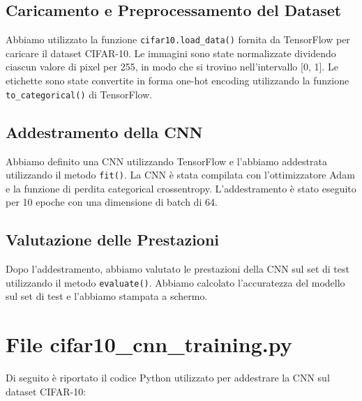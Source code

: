 \documentclass{article}
\begin{document}
\subsection{Caricamento e Preprocessamento del Dataset}
Abbiamo utilizzato la funzione \texttt{cifar10.load\_data()} fornita da TensorFlow per caricare il dataset CIFAR-10. Le immagini sono state normalizzate dividendo ciascun valore di pixel per 255, in modo che si trovino nell'intervallo [0, 1]. Le etichette sono state convertite in forma one-hot encoding utilizzando la funzione \texttt{to\_categorical()} di TensorFlow.

\subsection{Addestramento della CNN}
Abbiamo definito una CNN utilizzando TensorFlow e l'abbiamo addestrata utilizzando il metodo \texttt{fit()}. La CNN è stata compilata con l'ottimizzatore Adam e la funzione di perdita categorical crossentropy. L'addestramento è stato eseguito per 10 epoche con una dimensione di batch di 64.

\subsection{Valutazione delle Prestazioni}
Dopo l'addestramento, abbiamo valutato le prestazioni della CNN sul set di test utilizzando il metodo \texttt{evaluate()}. Abbiamo calcolato l'accuratezza del modello sul set di test e l'abbiamo stampata a schermo.

\section{File cifar10\_cnn\_training.py}
Di seguito è riportato il codice Python utilizzato per addestrare la CNN sul dataset CIFAR-10:
\end{document}
